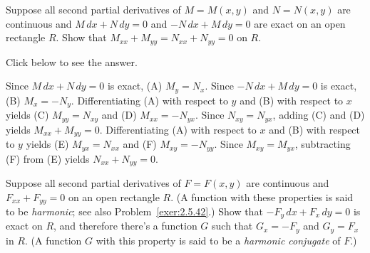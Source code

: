 \documentclass{ximera}
\begin{document}
\begin{problem}\label{exer:2.5.42}
Suppose  all second partial derivatives of $M=M(x,y)$ and $N=N(x,y)$
are continuous and $M\,dx+N\,dy=0$ and $-N\,dx+M\,dy=0$ are
exact on an open rectangle  $R$.  Show that
$M_{xx}+M_{yy}=N_{xx}+N_{yy}=0$ on
$R$.

Click below to see the answer.

\begin{expandable}
    Since $M\,dx+N\,dy=0$ is exact,  (A) $M_y=N_x$.
Since $-N\,dx+M\,dy=0$ is exact,  (B) $M_x=-N_y$.
Differentiating (A) with respect to $y$ and (B) with respect to
$x$ yields (C) $M_{yy}=N_{xy}$ and (D) $M_{xx}=-N_{yx}$.
Since $N_{xy}=N_{yx}$, adding (C) and (D) yields $M_{xx}+M_{yy}=0$.
Differentiating (A) with respect to $x$ and (B) with respect to
$y$ yields (E) $M_{yx}=N_{xx}$ and (F) $M_{xy}=-N_{yy}$.
Since $M_{xy}=M_{yx}$, subtracting (F) from (E) yields
$N_{xx}+N_{yy}=0$.
\end{expandable}
\end{problem}

\begin{problem}\label{exer:2.5.43} Suppose all second partial derivatives of
$F=F(x,y)$ are continuous and $F_{xx}+F_{yy}=0$ on an open rectangle
$R$. (A function with these properties is said to be \emph{harmonic};
see also Problem~\ref{exer:2.5.42}.) Show that $-F_y\,dx+F_x\,dy=0$ is
exact on $R$, and
therefore there's a function $G$ such that
$G_x=-F_y$ and $G_y=F_x$ in $R$. (A function $G$ with this property is
said to be a \emph{harmonic conjugate} of $F$.)
\end{problem}
\end{document}
